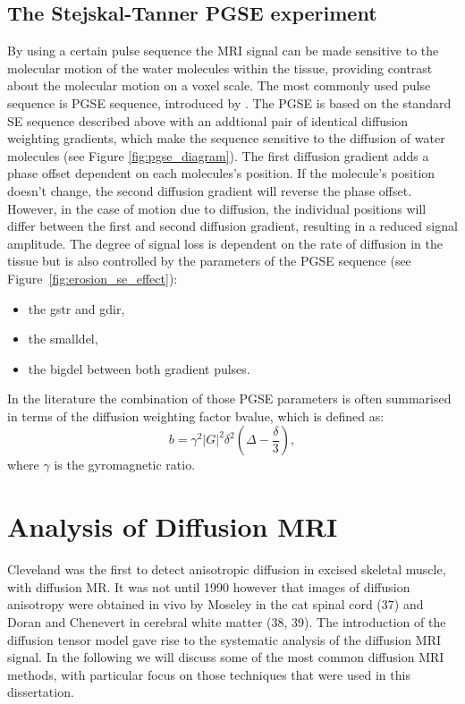 \subsection*{The Stejskal-Tanner PGSE experiment}
By using a certain pulse sequence the MRI signal can be made sensitive to the molecular motion of the water molecules within the tissue, providing contrast about the molecular motion on a voxel scale. The most commonly used pulse sequence is {\gls{PGSE}} sequence, introduced by \citep{Stejskal:1966}. The {\gls{PGSE}} is based on the standard SE sequence described above with an addtional pair of identical diffusion weighting gradients, which make the sequence sensitive to the diffusion of water molecules (see Figure \ref{fig:pgse_diagram}). The first diffusion gradient adds a phase offset dependent on each molecules's position. If the molecule's position doesn't change, the second diffusion gradient will reverse the phase offset. However, in the case of motion due to diffusion, the individual positions will differ between the first and second diffusion gradient, resulting in a reduced signal amplitude. The degree of signal loss is dependent on the rate of diffusion in the tissue but is also controlled by the parameters of the {\gls{PGSE}} sequence (see Figure~\ref{fig:erosion_se_effect}):
\begin{itemize}
	\item the {\gls{gstr}} and {\gls{gdir}},
	\item the {\gls{smalldel}},
	\item the {\gls{bigdel}} between both gradient pulses.
\end{itemize}

In the literature the combination of those PGSE parameters is often summarised in terms of the diffusion weighting factor {\gls{bvalue}}, which is defined as:
\begin{equation}
	b = \gamma^2|G|^2\delta^2(\Delta-\frac{\delta}{3}),
    \label{eq:bvalue}
\end{equation}
where $\gamma$ is the gyromagnetic ratio.

\section{Analysis of Diffusion MRI}
Cleveland \citep{Cleveland:XXX} was the first to detect anisotropic diffusion in excised skeletal muscle, with diffusion MR. It was not until 1990 however that images of diffusion anisotropy were obtained in vivo by Moseley in the cat spinal cord (37) and Doran and Chenevert in cerebral white matter (38, 39). The introduction of the diffusion tensor model gave rise to the systematic analysis of the diffusion MRI signal. In the following we will discuss some of the most common diffusion MRI methods, with particular focus on those techniques that were used in this dissertation. 

